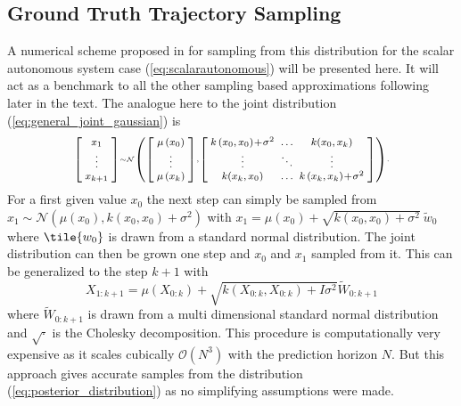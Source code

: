 \subsection{Ground Truth Trajectory Sampling}
    A numerical scheme proposed in \cite{Paper4:TrajecotryPrediction_Taylorexpansion} for sampling from this distribution for the scalar autonomous system case (\ref{eq:scalarautonomous}) will be presented here. It will act as a benchmark to all the other sampling based approximations following later in the text. The analogue here to the joint distribution (\ref{eq:general_joint_gaussian}) is
    \begin{equation}
        \footnotesize
        \setlength{\arraycolsep}{2.5pt}
        \medmuskip = 1mu %
        \scriptscriptstyle
        \centering
        \left[\begin{array}{c}
        x_{1} \\
        \vdots \\
        x_{k+1}
        \end{array}\right] \sim 
        \mathcal N \left(
        \left[\begin{array}{c}
        \mu\left(x_{0}\right) \\
        \vdots \\
        \mu\left(x_{k}\right)
        \end{array}\right] , {\left[\begin{array}{ccc}
        k\left(x_{0}, x_{0}\right)+\sigma ^2 & \ldots & k(x_0,x_k) \\
        \vdots & \ddots & \vdots \\
        k(x_k,x_0)  & \ldots & k\left(x_{k}, x_{k}\right)+\sigma ^2
        \end{array}\right]} \right).
    \end{equation}
    For a first given value $x_0$ the next step can simply be sampled from $x_1 \sim \mathcal N(\mu(x_0),k(x_0,x_0)+\sigma^2)$ with $ x_{1}=\mu\left(x_{0}\right)+\sqrt{k\left(x_{0}, x_{0}\right)+\sigma^2} \  \tilde{w}_{0} $ where $\tile{w_0}$ is drawn from a standard normal distribution. The joint distribution can then be grown one step and $x_0$ and $x_1$ sampled from it. This can be generalized to the step $k+1$ with
    \begin{equation}
    \label{eq:groundtruth}
    X_{1: k+1}=\mu\left(X_{0: k}\right)+\sqrt{k\left(X_{0: k}, X_{0: k}\right)+I \sigma^2} \tilde{W}_{0: k+1}
    \end{equation}
    where $\tilde{W}_{0: k+1}$ is drawn from a multi dimensional standard normal distribution and $\sqrt{\cdot}$ is the Cholesky decomposition. This procedure is computationally very expensive as it scales cubically $\mathcal O(N^3)$ with the prediction horizon $N$. But this approach gives accurate samples from the distribution (\ref{eq:posterior_distribution}) as no simplifying assumptions were made.
